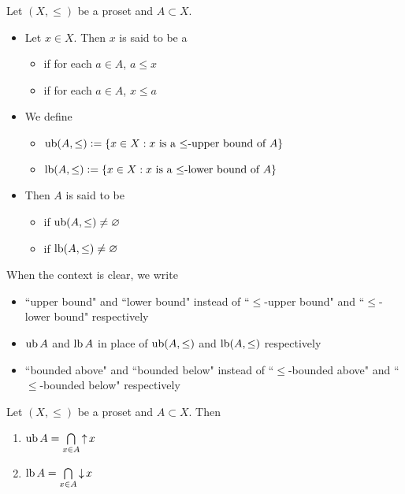 \documentclass{book}
\begin{document}
	\begin{defn} 
		Let $(X, \leq)$ be a proset and $A \subset X$. 
		\begin{itemize}
			\item Let $x \in X$. Then $x$ is said to be a
			\begin{itemize}
				\item {} if for each $a \in A$, $a \leq x$
				\item {} if for each $a \in A$, $x \leq a$
			\end{itemize} 
			\item We define 
			\begin{itemize}
				\item $\operatorname{ub} (A, \leq) \vcentcolon= \{x \in X: \text{$x$ is a $\leq$-upper bound of $A$}\}$ 
				\item $\operatorname{lb}(A, \leq) \vcentcolon= \{x \in X: \text{$x$ is a $\leq$-lower bound of $A$}\}$ 
			\end{itemize} 
			\item Then $A$ is said to be 
			\begin{itemize}
				\item {} if $\operatorname{ub}(A, \leq) \neq \varnothing$
				\item {} if $\operatorname{lb}(A, \leq) \neq \varnothing$
			\end{itemize}
		\end{itemize}
	\end{defn}
	
	\begin{note}
		When the context is clear, we write 
		\begin{itemize}
			\item ``upper bound" and ``lower bound" instead of ``$\leq$-upper bound" and ``$\leq$-lower bound" respectively
			\item $\operatorname{ub} A$ and $\operatorname{lb} A$ in place of $\operatorname{ub} (A, \leq)$ and $\operatorname{lb} (A, \leq)$  respectively
			\item ``bounded above" and ``bounded below" instead of ``$\leq$-bounded above" and ``$\leq$-bounded below" respectively
		\end{itemize}
	\end{note}
	
	\begin{ex} 
		Let $(X, \leq)$ be a proset and $A \subset X$. Then 
		\begin{enumerate}
			\item $\operatorname{ub} A = \bigcap\limits_{x \in A} \operatorname{\uparrow} x$
			\item $\operatorname{lb} A = \bigcap\limits_{x \in A} \operatorname{\downarrow} x$
		\end{enumerate}
	\end{ex}
	
\end{document}
